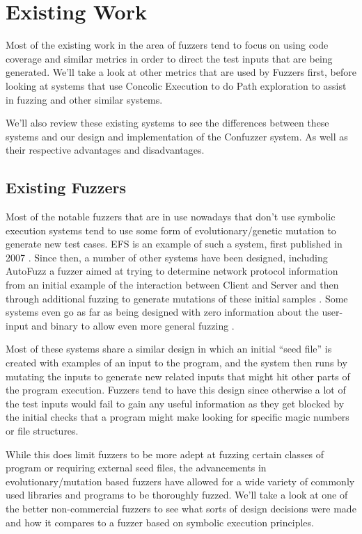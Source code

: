 \chapter{Existing Work}
Most of the existing work in the area of fuzzers tend to focus on using code
coverage and similar metrics in order to direct the test inputs that are being
generated. We'll take a look at other metrics that are used by Fuzzers first,
before looking at systems that use Concolic Execution to do Path exploration to
assist in fuzzing and other similar systems.

We'll also review these existing systems to see the differences between these
systems and our design and implementation of the Confuzzer system. As well as
their respective advantages and disadvantages.

\section{Existing Fuzzers}
Most of the notable fuzzers that are in use nowadays that don't use symbolic
execution systems tend to use some form of evolutionary/genetic mutation to
generate new test cases. EFS is an example of such a system, first published in
2007 \cite{evolfuzzing}. Since then, a number of other systems have been
designed, including AutoFuzz a fuzzer aimed at trying to determine network
protocol information from an initial example of the interaction between Client
and Server and then through additional fuzzing to generate mutations of these
initial samples \cite{autofuzz}. Some systems even go as far as being designed
with zero information about the user-input and binary to allow even more general
fuzzing \cite{zerofuzz}. 

Most of these systems share a similar design in which an initial ``seed file''
is created with examples of an input to the program, and the system then runs by
mutating the inputs to generate new related inputs that might hit other parts of
the program execution. Fuzzers tend to have this design since otherwise a lot of
the test inputs would fail to gain any useful information as they get blocked by
the initial checks that a program might make looking for specific magic numbers
or file structures.

While this does limit fuzzers to be more adept at fuzzing certain classes of
program or requiring external seed files, the advancements in
evolutionary/mutation based fuzzers have allowed for a wide variety of commonly
used libraries and programs to be thoroughly fuzzed. We'll take a look at one of
the better non-commercial fuzzers to see what sorts of design decisions were
made and how it compares to a fuzzer based on symbolic execution principles.

